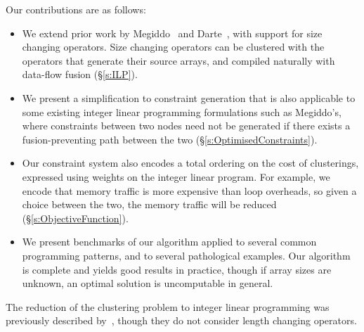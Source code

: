 Our contributions are as follows:
\begin{itemize}
\item   
We extend prior work by Megiddo~\cite{megiddo1998optimal} and Darte~\cite{darte2002contraction}, with support for size changing operators. Size changing operators can be clustered with the operators that generate their source arrays, and compiled naturally with data-flow fusion (\S\ref{s:ILP}).

\item
We present a simplification to constraint generation that is also applicable to some existing integer linear programming formulations such as Megiddo's,
where constraints between two nodes need not be generated if there exists a fusion-preventing path between the two (\S\ref{s:OptimisedConstraints}).

\item
Our constraint system also encodes a total ordering on the cost of clusterings, expressed using weights on the integer linear program. For example, we encode that memory traffic is more expensive than loop overheads, so given a choice between the two, the memory traffic will be reduced (\S\ref{s:ObjectiveFunction}).

\item
We present benchmarks of our algorithm applied to several common programming patterns, and to several pathological examples.
Our algorithm is complete and yields good results in practice, though if array sizes are unknown, an optimal solution is uncomputable in general. 
\end{itemize}

The reduction of the clustering problem to integer linear programming was previously described by~\cite{megiddo1998optimal}, though they do not consider length changing operators.




